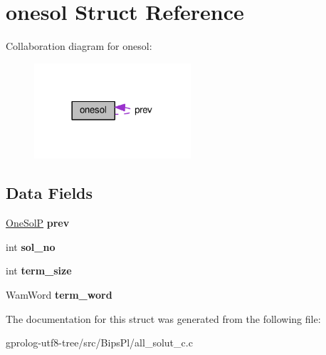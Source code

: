 \hypertarget{structonesol}{}\section{onesol Struct Reference}
\label{structonesol}


Collaboration diagram for onesol\+:\nopagebreak
\begin{figure}[H]
\begin{center}
\leavevmode
\includegraphics[width=165pt]{structonesol__coll__graph}
\end{center}
\end{figure}
\subsection*{Data Fields}
\begin{DoxyCompactItemize}
\item 
\hyperlink{structonesol}{One\+SolP} {\bfseries prev}\hypertarget{structonesol_a67474d69d62f74ecb1da52cf3a6fd255}{}\label{structonesol_a67474d69d62f74ecb1da52cf3a6fd255}

\item 
int {\bfseries sol\+\_\+no}\hypertarget{structonesol_adf8141bfb4d67ec7ef0cdb66abc2e03d}{}\label{structonesol_adf8141bfb4d67ec7ef0cdb66abc2e03d}

\item 
int {\bfseries term\+\_\+size}\hypertarget{structonesol_a7d00bc5747882c6030eff6839217f1d5}{}\label{structonesol_a7d00bc5747882c6030eff6839217f1d5}

\item 
Wam\+Word {\bfseries term\+\_\+word}\hypertarget{structonesol_ad2da50a130c4212644b22689ded445bf}{}\label{structonesol_ad2da50a130c4212644b22689ded445bf}

\end{DoxyCompactItemize}


The documentation for this struct was generated from the following file\+:\begin{DoxyCompactItemize}
\item 
gprolog-\/utf8-\/tree/src/\+Bips\+Pl/all\+\_\+solut\+\_\+c.\+c\end{DoxyCompactItemize}
